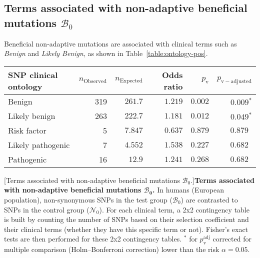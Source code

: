 \documentclass{article}
\newcommand{\SphyNeu}{\mathcal{N}_0}
\newcommand{\SphyBen}{\mathcal{B}_0}
\begin{document}
    \subsection{Terms associated with non-adaptive beneficial mutations \texorpdfstring{$\SphyBen$}{B₀}}
    Beneficial non-adaptive mutations are associated with clinical terms such as \textit{Benign} and \textit{Likely Benign}, as shown in Table~\ref{table:ontology-pos}.
    \begin{center}
        \begin{tabular}{|l|r|r|r|r|r|}
            \toprule
            SNP clinical ontology & $n_{\mathrm{Observed}}$ & $n_{\mathrm{Expected}}$ & Odds ratio & $p_{\mathrm{v}}$ & $p_{\mathrm{v-adjusted}}$ \\
            \midrule
            Benign                & 319                     & $ 261.7$                & $ 1.219$   & $ 0.002$         & $\bm{ 0.009{^*}}$         \\
            Likely benign         & 263                     & $ 222.7$                & $ 1.181$   & $ 0.012$         & $\bm{ 0.049{^*}}$         \\
            Risk factor           & 5                       & $ 7.847$                & $ 0.637$   & $ 0.879$         & $ 0.879~~$                \\
            Likely pathogenic     & 7                       & $ 4.552$                & $ 1.538$   & $ 0.227$         & $ 0.682~~$                \\
            Pathogenic            & 16                      & $  12.9$                  & $ 1.241$   & $ 0.268$         & $ 0.682~~$                \\
            \bottomrule
        \end{tabular}
        [Terms associated with non-adaptive beneficial mutations $\SphyBen$.]{\textbf{Terms associated with non-adaptive beneficial mutations $\bm{\SphyBen}$.}
        In humans (European population), non-synonymous SNPs in the test group ($\SphyBen$) are contrasted to SNPs in the control group ($\SphyNeu$).
        For each clinical term, a 2x2 contingency table is built by counting the number of SNPs based on their selection coefficient and their clinical terms (whether they have this specific term or not).
        Fisher's exact tests are then performed for these 2x2 contingency tables.
        $^*$ for $p_{\mathrm{v}}^{\mathrm{adj}}$ corrected for multiple comparison (Holm–Bonferroni correction) lower than the risk $\alpha=0.05$.\label{table:ontology-pos}}
    \end{center}

    \printbibliography
\end{document}
